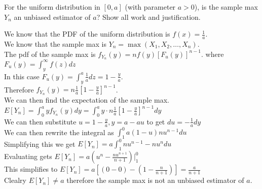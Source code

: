 \documentclass[answers,12pt,addpoints]{exam}
\begin{document}
\begin{questions}
\begin{solution}
    \end{solution}
    \question For the uniform distribution in $[0, a]$ (with parameter $a > 0$), is the sample max $Y_n$ an unbiased estimator of $a$? Show all work and justification.
    \begin{solution}
        We know that the PDF of the uniform distribution is $f(x) = \frac{1}{a}$.\\
        We know that the sample max is $Y_n = \max(X_1, X_2, \ldots, X_n)$.\\
        The pdf of the sample max is $f_{Y_n}(y) = nf(y)[F_u(y)]^{n-1}$. where $F_u(y) = \int_y^\infty f(z)dz$\\
        In this case $F_u(y) = \int_y^a \frac{1}{a}dz = 1 - \frac{y}{a}$.\\
        Therefore $f_{Y_n}(y) = n\frac{1}{a}[1 - \frac{y}{a}]^{n-1}$.\\
        We can then find the expectation of the sample max.
        $E[Y_n] = \int_{0}^{a}yf_{Y_n}(y)dy = \int_{0}^{a}y \cdot n\frac{1}{a}[1 - \frac{y}{a}]^{n-1}dy$\\
        We can then substitute $u = 1 - \frac{y}{a}, y = a - au$ to get $du = -\frac{1}{a}dy$\\
        We can then rewrite the integral as $\int_{1}^{0}a(1-u)nu^{n-1}du$\\
        Simplifying this we get $E[Y_n] = a\int_{1}^{0}nu^{n-1} - nu^{n}du$\\
        Evaluating gets $E[Y_n] = a(u^{n} - \frac{nu^{n+1}}{n+1}) \Big|_{1}^{0}$\\
        This simplifies to $E[Y_n] = a[(0 - 0) - (1 - \frac{n}{n+1})] = \frac{a}{n+1}$\\
        Clealry $E[Y_n] \neq a$ therefore the sample max is not an unbiased estimator of $a$.\\
    \end{solution}
    
\end{questions}
\end{document}
